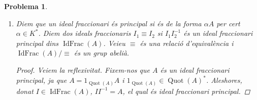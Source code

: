 \documentclass{article}
\DeclareMathOperator{\Quot}{Quot}
\DeclareMathOperator{\Spec}{Spec}
\DeclareMathOperator{\IdFrac}{IdFrac}
\newtheorem{problema}{Problema}
\begin{document}
\begin{problema}
\begin{enumerate}
\begin{proof}
\begin{align*}
            \end{align*}
            d'on deduïm que $J=\mathfrak{p}_{1}^{a_{1}-b_{1}}\cdot\ldots\cdot\mathfrak{p}_{n}^{a_{n}-b_{n}}$.  Aleshores, podem definir un morfisme d'$A$-mòduls
            \begin{center}
            \end{center}
            definit via $\varphi(\mathfrak{p}^{a_{\mathfrak{p}}}):=(\delta_{\mathfrak{p},\mathfrak{q}}a_{\mathfrak{p}})_{\mathfrak{q}\in\Spec(A)}$, on $\delta_{\mathfrak{p},\mathfrak{q}}$ és la delta de Kronecker, i estenent per linealitat (ho podem fer ja que $\Spec(A)$ genera $\IdFrac(A)$ per la factorització anterior). Clarament $\varphi$ esta ben definida i és isomorfisme ja que la factorització és única per ser $A$ Dedekind. D'aquí deduïm es veu clarament que és lliure. Que $\IdFrac(A)$ és un grup abelià ve de que és monoide i de l'existència d'inversos de l'apartat anterior.
        \end{proof}
        Proveu que tot ideal fraccionari de $A$ és un $A$-mòdul finit generat.
        \begin{proof}
            Sigui $J\in\IdFrac(A)$. Com $J(A:J)=A$,
            \begin{equation*}
                \exists x_{1}\ldots\exists x_{n}\exists y_{1}\ldots\exists y_{n}(x_{1},\ldots,x_{n}\in J,y_{1},\ldots,y_{n}\in\Big((A:J)\land\sum_{i=1}^{n}x_{i}y_{i}=1_{A}\Big)
            \end{equation*}
            Aleshores, com $y_{i}\in(A:J)\implies y_{i}J\subset A$, $J=\sum_{i=1}^{n}x_{i}y_{i}J\subset\sum_{i=1}^{n}x_{i}A$. Aleshores, com $A$ és noetherià, tot $A$-submòdul d'un finit generat és finit generat. Aleshores, $J$ és finit generat.
        \end{proof}
        \item Diem que un ideal fraccionari és principal si és de la forma $\alpha A$ per cert $\alpha\in K^{*}$. Diem dos ideals fraccionaris $I_{1}\equiv I_{2}$ si $I_{1}I_{2}^{-1}$ és un ideal fraccionari principal dins $\IdFrac(A)$. Veieu $\equiv$ és una relació d'equivalència i $\IdFrac(A)/\equiv$ és un grup abelià.
        \begin{proof}
            Veiem la reflexivitat. Fixem-nos que $A$ és un ideal fraccionari principal, ja que $A=1_{\Quot(A)}A$ i $1_{\Quot(A)}\in\Quot(A)^{*}$. Aleshores, donat $I\in\IdFrac(A)$, $II^{-1}=A$, el qual és ideal fraccionari principal.\newline

\end{proof}
\end{enumerate}
\end{problema}
\end{document}
